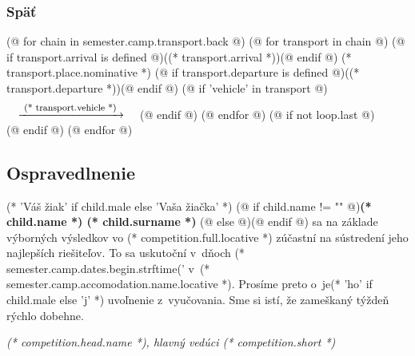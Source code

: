                 \subsubsection{Späť}
                (@ for chain in semester.camp.transport.back @)
                    (@ for transport in chain @)
                        (@ if transport.arrival is defined @)((* transport.arrival *))(@ endif @)
                        (* transport.place.nominative *)
                        (@ if transport.departure is defined @)((* transport.departure *))(@ endif @)%
                        (@ if 'vehicle' in transport @) $\quad\xrightarrow{\raisebox{-4mm}{\footnotesize\text{\ (* transport.vehicle *)\ }}}\quad$ (@ endif @)
                    (@ endfor @)%
                    (@ if not loop.last @)\\(@ endif @)%
                (@ endfor @)

            \cutHere

            \subsection{Ospravedlnenie}
                (* 'Váš žiak' if child.male else 'Vaša žiačka' *)
                (@ if child.name != "" @)\textbf{(* child.name *) (* child.surname *)} (@ else @)\makebox[30mm]{\dotfill}(@ endif @)
                sa na základe výborných výsledkov vo (* competition.full.locative *)
                zúčastní na sústredení jeho najlepších riešiteľov. To sa uskutoční v~dňoch
                (* semester.camp.dates.begin.strftime('%
                v~(* semester.camp.accomodation.name.locative *). Prosíme preto o~je(* 'ho' if child.male else 'j' *) uvoľnenie z~vyučovania.
                Sme si istí, že zameškaný týždeň rýchlo dobehne.
                \vspace{5mm}

                \hfill \makebox[54mm]{\dotfill}

                \vspace*{-8pt}
                \hfill \textit{(* competition.head.name *), hlavný vedúci (* competition.short *)}

            \cutHere

